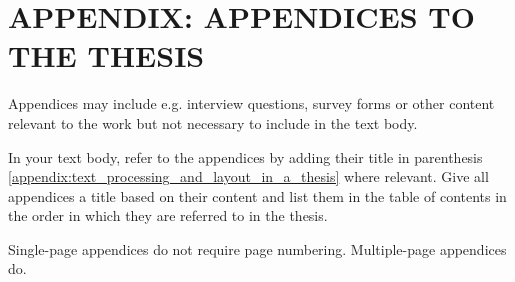 \chapter{APPENDIX: APPENDICES TO THE THESIS}
Appendices may include e.g. interview questions, survey forms or other content relevant to the work but not necessary to include in the text body.

In your text body, refer to the appendices by adding their title in parenthesis \autoref{appendix:text_processing_and_layout_in_a_thesis} where relevant. Give all appendices a title based on their content and list them in the table of contents in the order in which they are referred to in the thesis.

Single-page appendices do not require page numbering. Multiple-page appendices do.